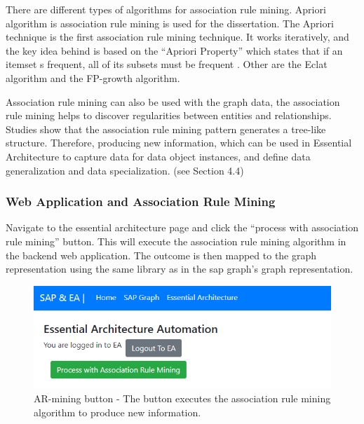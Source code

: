 \documentclass{article}
\begin{document}
There are different types of algorithms for association rule mining. Apriori algorithm is association rule mining is used for the dissertation. The Apriori technique is the first association rule mining technique. It works iteratively, and the key idea behind is based on the “Apriori Property” which states that if an itemset s frequent, all of its subsets must be frequent \parencite{yuan2017}. Other are the Eclat algorithm and the FP-growth algorithm.

Association rule mining can also be used with the graph data, the association rule mining helps to discover regularities between entities and relationships. Studies show that the association rule mining pattern generates a tree-like structure. Therefore, producing new information, which can be used in Essential Architecture to capture data for data object instances, and define data generalization and data specialization. (see Section 4.4)

\maketitle
\subsubsection{Web Application and Association Rule Mining}

Navigate to the essential architecture page and click the “process with association rule mining” button. This will execute the association rule mining algorithm in the backend web application. The outcome is then mapped to the graph representation using the same library as in the sap graph’s graph representation.

\begin{figure}[ht!]
    \centering
    \includegraphics[scale=0.6]{ea-ar}
    \caption{AR-mining button - 
The button executes the association rule mining algorithm to produce new information.}
    \label{fig:ea-min-ar}
\end{figure}
\end{document}
